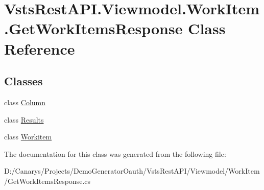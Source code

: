\hypertarget{class_vsts_rest_a_p_i_1_1_viewmodel_1_1_work_item_1_1_get_work_items_response}{}\section{Vsts\+Rest\+A\+P\+I.\+Viewmodel.\+Work\+Item.\+Get\+Work\+Items\+Response Class Reference}
\label{class_vsts_rest_a_p_i_1_1_viewmodel_1_1_work_item_1_1_get_work_items_response}
\subsection*{Classes}
\begin{DoxyCompactItemize}
\item 
class \mbox{\hyperlink{class_vsts_rest_a_p_i_1_1_viewmodel_1_1_work_item_1_1_get_work_items_response_1_1_column}{Column}}
\item 
class \mbox{\hyperlink{class_vsts_rest_a_p_i_1_1_viewmodel_1_1_work_item_1_1_get_work_items_response_1_1_results}{Results}}
\item 
class \mbox{\hyperlink{class_vsts_rest_a_p_i_1_1_viewmodel_1_1_work_item_1_1_get_work_items_response_1_1_workitem}{Workitem}}
\end{DoxyCompactItemize}


The documentation for this class was generated from the following file\+:\begin{DoxyCompactItemize}
\item 
D\+:/\+Canarys/\+Projects/\+Demo\+Generator\+Oauth/\+Vsts\+Rest\+A\+P\+I/\+Viewmodel/\+Work\+Item/Get\+Work\+Items\+Response.\+cs\end{DoxyCompactItemize}
